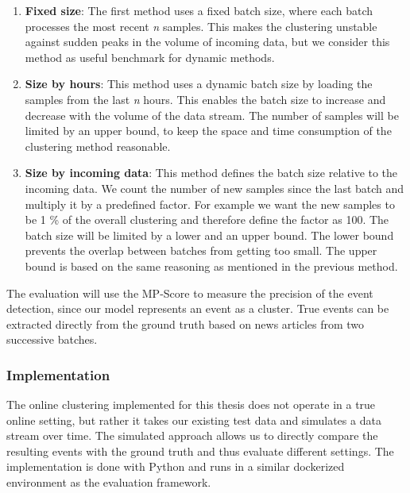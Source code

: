 \begin{enumerate}
    \item \textbf{Fixed size}: The first method uses a fixed batch size, where each batch processes the most recent \textit{n} samples. This makes the clustering unstable against sudden peaks in the volume of incoming data, but we consider this method as useful benchmark for dynamic methods.
    \item \textbf{Size by hours}: This method uses a dynamic batch size by loading the samples from the last \textit{n} hours. This enables the batch size to increase and decrease with the volume of the data stream. The number of samples will be limited by an upper bound, to keep the space and time consumption of the clustering method reasonable. 
    \item \textbf{Size by incoming data}: This method defines the batch size relative to the incoming data. We count the number of new samples since the last batch and multiply it by a predefined factor. For example we want the new samples to be 1 \% of the overall clustering and therefore define the factor as 100. The batch size will be limited by a lower and an upper bound. The lower bound prevents the overlap between batches from getting too small. The upper bound is based on the same reasoning as mentioned in the previous method.
\end{enumerate}

The evaluation will use the MP-Score to measure the precision of the event detection,
since our model represents an event as a cluster.
True events can be extracted directly from the ground truth based on news articles from two successive batches.

\subsubsection{Implementation}
\label{subsubsec:4c_implementation}

The online clustering implemented for this thesis does not operate in a true online setting,
but rather it takes our existing test data and simulates a data stream over time.
The simulated approach allows us to directly compare the resulting events
with the ground truth and thus evaluate different settings.
The implementation is done with Python and runs in a similar dockerized environment as the evaluation framework.

